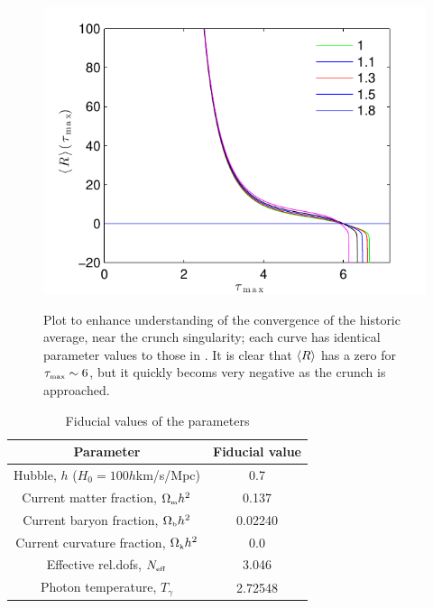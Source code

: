 \documentclass[amsmath,amssymb,12pt,eqsecnum]{revtex4}
\begin{document}
\begin{figure}[!t]
      \begin{center}
{\includegraphics[scale=0.8]{images/Cplot.pdf}}
      \end{center}
\caption{Plot to enhance understanding of the convergence of the historic average, near the crunch singularity; each curve has identical parameter values to those in . It is clear that $\left\langle R\right\rangle$ has a zero for ${\tau}_{\scriptscriptstyle{\textrm{max}}}\sim 6$, but it quickly becoms very negative as the crunch is approached. }\label{fig:num_solns_deevolve}
\end{figure}

{\renewcommand{\arraystretch}{1.4}
\begin{table}%
\begin{center}
\begin{tabular}{||c |  c ||}
\hline
\textbf{Parameter} & \textbf{Fiducial value} \\
\hline
Hubble, $h$ ($H_0 = 100h$km/s/Mpc) & 0.7 \\\hline
Current matter fraction, ${\Omega}_{\scriptscriptstyle{\textrm{m}}}h^2$ &0.137  \\\hline
Current baryon fraction, ${\Omega}_{\scriptscriptstyle{\textrm{b}}}h^2$ &0.02240  \\\hline
Current curvature fraction, ${\Omega}_{\scriptscriptstyle{\textrm{k}}}h^2$ &0.0 \\\hline
Effective rel.dofs, ${N}_{\scriptscriptstyle{\textrm{eff}}}$ &3.046 \\\hline
Photon temperature, $T_{\gamma}$ & 2.72548 \\\hline
\end{tabular}\caption{Fiducial values of the parameters}\label{tab:fid_params}
\end{center}
\end{table}
}
\end{document}

